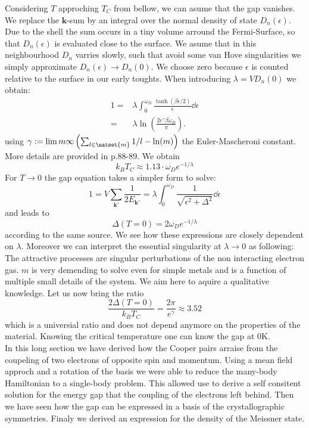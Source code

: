 \documentclass[../main.tex]{subfile}
\begin{document}
Considering $T$ approching $T_C$ from bellow, we can asume that the gap vanishes. We replace the $\bm{k}$-sum by an integral over the normal 
density of state $D_n(\epsilon)$. Due to the shell the sum occurs in a tiny volume arround the Fermi-Surface, so that $D_n(\epsilon)$ is 
evaluated close to the surface. We asume that in this neighbourhood $D_n$ varries slowly, such that avoid some van Hove singularities we 
simply approximate $D_n(\epsilon) \rightarrow D_n(0)$. We choose zero because $\epsilon$ is counted relative to the surface in our early toughts. 
When introducing $\lambda = V D_n(0)$ we obtain:
\begin{equation*}
    \begin{aligned}
        1 =& \lambda \int_0^{\omega_D} \frac{\tanh\left(\beta\epsilon/2\right)}{\epsilon} \dd \epsilon\\
        =& \lambda \ln\left(\frac{2e^{\gamma}\beta \omega_D}{\pi}\right).
    \end{aligned}
\end{equation*}
using $\gamma := \lim{m}{\infty} \left(\sum_{l\in\natset{m}} 1/l - \ln(m)\right)$ the Euler-Mascheroni constant. More details are provided
in \cite{FossheimSudbo2004} p.88-89. We obtain 
\[
    k_B T_C \approx 1.13\cdot  \omega_D e^{-1/\lambda}
\]
For $T\rightarrow 0$ the gap equation takes a simpler form to solve:
\begin{equation*}
        1 = V \sum_{\bm{k}'} \frac{1}{2 E_{\bm{k}'}} = \lambda\int_0^{\omega_D}  \frac{1}{\sqrt{\epsilon^2 + \Delta^2}}\dd \epsilon
\end{equation*}
and leads to 
\[
    \Delta(T=0) = 2 \omega_D e^{-1/\lambda}
\]
according to the same source. We see how these expressions are closely dependent on $\lambda$. Moreover we can interpret the essential singularity
at $\lambda\rightarrow 0$ as following: The attractive processes are singular perturbations of the non interacting electron gas.
$m$ is very demending to solve even for simple metals and is a function of multiple small details of the system. We aim here 
to aquire a qualitative knowledge. Let us now bring the ratio
\[
    \frac{2\Delta(T=0)}{k_B T_C} = \frac{2 \pi}{e^{\gamma}} \approx 3.52
\]  
which is a universial ratio and does not depend anymore on the properties of the material. Knowing the critical temperature one can know
the gap at $0\si{\kelvin}$.\\

In this long section we have derived how the Cooper pairs arraise from the coupeling of two electrons of opposite spin and momentum. Using a mean field approch
and a rotation of the basis we were able to reduce the many-body Hamiltonian to a single-body problem. This allowed use to derive a self consitent solution for 
the energy gap that the coupling of the electrons left behind. Then we have seen how the gap can be expressed in a basis of the crystallographic symmetries.
Finaly we derived an expression for the density of the Meissner state.\\
\end{document}
